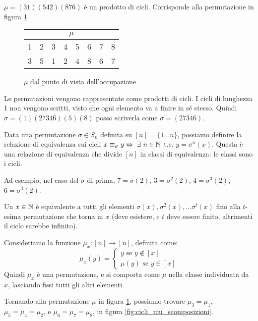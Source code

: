 $\mu = (3 1) (5 4 2) (8 7 6)$ \`e un prodotto di cicli. Corrisponde alla permutazione in figura \ref{fig:cicli_mu_occupazione}.

\begin{figure}[ht]
\centering
\begin{tabular}{*{8}{c}}
\multicolumn{8}{c}{$\mu$} \\
\hline
1 & 2 & 3 & 4 & 5 & 6 & 7 & 8 \\
3 & 5 & 1 & 2 & 4 & 8 & 6 & 7
\end{tabular}
\caption{$\mu$ dal punto di vista dell'occupazione\label{fig:cicli_mu_occupazione}}
\end{figure}

Le permutazioni vengono rappresentate come prodotti di cicli. I cicli di lunghezza 1 non vengono scritti, visto che ogni elemento va a finire in s\'e stesso. Quindi $\sigma = (1) (2 7 3 4 6) (5) (8)$ posso scriverla come $\sigma = (2 7 3 4 6)$.

Data una permutazione $\sigma \in S_n$ definita su $[n] = \{1 \dots n\}$, possiamo definire la relazione di equivalenza sui cicli $x \equiv_{\sigma} y \iff \exists n \in \naturals $ t.c. $ y = \sigma^{n} (x)$. Questa \`e una relazione di equivalenza che divide $[n]$ in classi di equivalenza: le classi sono i cicli.

Ad esempio, nel caso del $\sigma$ di prima, $7 = \sigma (2)$, $3 = \sigma^{2}(2)$, $4 = \sigma^{3} (2)$, $6 = \sigma^{4} (2)$.

Un $x \in \mathbb{N}$ \`e equivalente a tutti gli elementi $\sigma (x), \sigma^{2} (x), \dots \sigma^{t}(x)$ fino alla $t$-esima permutazione che torna in $x$ (deve esistere, e $t$ deve essere finito, altrimenti il ciclo sarebbe infinito).

Consideriamo la funzione $\mu_x : [n] \to [n]$, definita come:
\[
\mu_x (y) =
\begin{cases}
y \text{ se } y \notin [x] \\
\mu (y) \text{ se } y \in [x]
\end{cases}
\]
Quindi $\mu_x$ \`e una permutazione, e si comporta come $\mu$ nella classe individuata da $x$, lasciando fissi tutti gli altri elementi.

Tornando alla permutazione $\mu$ in figura \ref{fig:cicli_mu_occupazione}, possiamo trovare $\mu_3 = \mu_1$, $\mu_5 = \mu_4 = \mu_2$, e $\mu_6 = \mu_7 = \mu_8$, in figura \ref{fig:cicli_mu_scomposizioni}.

